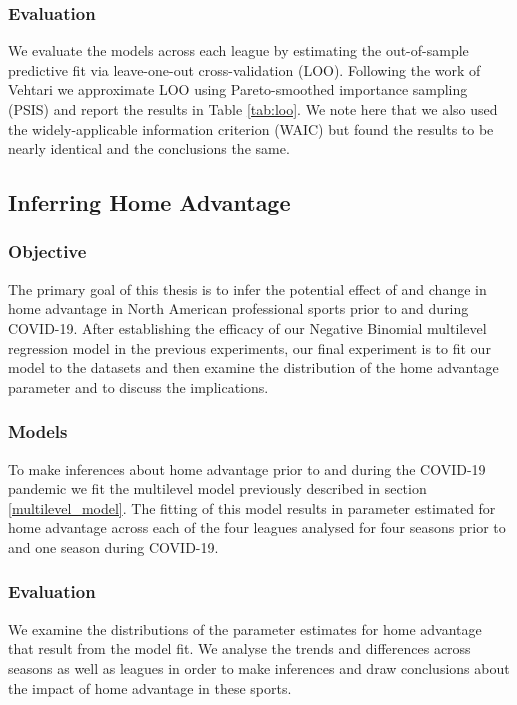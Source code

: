 \subsubsection*{Evaluation}

We evaluate the models across each league by estimating the out-of-sample predictive fit via leave-one-out cross-validation (LOO). Following the work of Vehtari \cite{Vehtari2016} we approximate LOO using Pareto-smoothed importance sampling (PSIS) and report the results in Table \ref{tab:loo}. We note here that we also used the widely-applicable information criterion (WAIC) \cite{Watanabe2010} but found the results to be nearly identical and the conclusions the same.

\subsection{Inferring Home Advantage} \label{experiment_3}

\subsubsection*{Objective}

The primary goal of this thesis is to infer the potential effect of and change in home advantage in North American professional sports prior to and during COVID-19. After establishing the efficacy of our Negative Binomial multilevel regression model in the previous experiments, our final experiment is to fit our model to the datasets and then examine the distribution of the home advantage parameter and to discuss the implications.

\subsubsection*{Models}

To make inferences about home advantage prior to and during the COVID-19 pandemic we fit the multilevel model previously described in section \ref{multilevel_model}. The fitting of this model results in parameter estimated for home advantage across each of the four leagues analysed for four seasons prior to and one season during COVID-19.

\subsubsection*{Evaluation}

We examine the distributions of the parameter estimates for home advantage that result from the model fit. We analyse the trends and differences across seasons as well as leagues in order to make inferences and draw conclusions about the impact of home advantage in these sports.